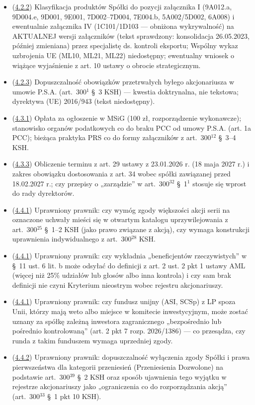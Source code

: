 \documentclass[12pt,a4paper]{report}
\begin{document}
\begin{itemize}
  \item (\hyperref[memo:4.2.2]{4.2.2}) Klasyfikacja produktów Spółki do pozycji załącznika I (9A012.a, 9D004.e, 9D001, 9E001, 7D002--7D004, 7E004.b, 5A002/5D002, 6A008) i ewentualnie załącznika IV (1C101/1D103 --- obniżona wykrywalność) na AKTUALNEJ wersji załączników (tekst sprawdzony: konsolidacja 26.05.2023, później zmieniana) przez specjalistę ds. kontroli eksportu; Wspólny wykaz uzbrojenia UE (ML10, ML21, ML22) niedostępny; ewentualny wniosek o wiążące wyjaśnienie z art. 10 ustawy o obrocie strategicznym.
  \item (\hyperref[memo:4.2.3]{4.2.3}) Dopuszczalność obowiązków przetrwałych byłego akcjonariusza w umowie P.S.A. (art.~300$^{1}$ §~3 KSH) --- kwestia doktrynalna, nie tekstowa; dyrektywa (UE) 2016/943 (tekst niedostępny).
  \item (\hyperref[memo:4.3.1]{4.3.1}) Opłata za ogłoszenie w MSiG (100 zł, rozporządzenie wykonawcze); stanowisko organów podatkowych co do braku PCC od umowy P.S.A. (art. 1a PCC); bieżąca praktyka PRS co do formy załączników z art.~300$^{12}$ §~3--4 KSH.
  \item (\hyperref[memo:4.3.3]{4.3.3}) Obliczenie terminu z art. 29 ustawy z 23.01.2026 r. (18 maja 2027 r.) i zakres obowiązku dostosowania z art. 34 wobec spółki zawiązanej przed 18.02.2027 r.; czy przepisy o „zarządzie” w art.~300$^{32}$ §~1$^{1}$ stosuje się wprost do rady dyrektorów.
  \item (\hyperref[memo:4.4.1]{4.4.1}) Uprawniony prawnik: czy wymóg zgody większości akcji serii na oznaczone uchwały mieści się w otwartym katalogu uprzywilejowania z art.~300$^{25}$ §~1–2 KSH (jako prawo związane z akcją), czy wymaga konstrukcji uprawnienia indywidualnego z art.~300$^{28}$ KSH.
  \item (\hyperref[memo:4.4.1]{4.4.1}) Uprawniony prawnik: czy wykładnia „beneficjentów rzeczywistych” w §~11 ust. 6 lit. b może odsyłać do definicji z art. 2 ust. 2 pkt 1 ustawy AML (więcej niż 25\% udziałów lub głosów albo inna kontrola) i czy sam brak definicji nie czyni Kryterium nieostrym wobec rejestru akcjonariuszy.
  \item (\hyperref[memo:4.4.1]{4.4.1}) Uprawniony prawnik: czy fundusz unijny (ASI, SCSp) z LP spoza Unii, którzy mają weto albo miejsce w komitecie inwestycyjnym, może zostać uznany za spółkę zależną inwestora zagranicznego „bezpośrednio lub pośrednio kontrolowaną” (art. 2 pkt 7 rozp. 2026/1386) — co przesądza, czy runda z takim funduszem wymaga uprzedniej zgody.
  \item (\hyperref[memo:4.4.2]{4.4.2}) Uprawniony prawnik: dopuszczalność wyłączenia zgody Spółki i prawa pierwszeństwa dla kategorii przeniesień (Przeniesienia Dozwolone) na podstawie art.~300$^{39}$ §~2 KSH oraz sposób ujawnienia tego wyjątku w rejestrze akcjonariuszy jako „ograniczenia co do rozporządzania akcją” (art.~300$^{33}$ §~1 pkt 10 KSH).

\end{itemize}
\end{document}
